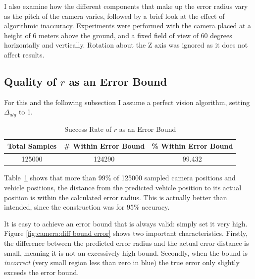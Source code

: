\documentclass[a4paper,12pt,twoside,openright]{report}
\begin{document}
I also examine how the different components that make up the error radius vary
as the pitch of the camera varies, followed by a brief look at the
effect of algorithmic inaccuracy. Experiments were performed
with the camera placed at a height of 6 meters above the ground, and a fixed
field of view of 60 degrees horizontally and vertically. Rotation about the Z axis
was ignored as it does not affect results.

\subsection{Quality of $r$ as an Error Bound}

For this and the following subsection I assume a perfect vision algorithm,
setting $\Delta_{alg}$ to 1.

\begin{table}[htb]
    \centering
    \caption[$r$ as an Error Bound]{Success Rate of $r$ as an Error Bound}
    \label{tab:camera:bound accuracy}
    \begin{tabular}{@{}ccc@{}}
        \toprule
        Total Samples & \# Within Error Bound & \% Within Error Bound \\ \midrule
        125000              & 124290                  & 99.432 
    \end{tabular}
\end{table}

Table~\ref{tab:camera:bound accuracy} shows that more than 99\% of 125000 sampled camera positions
and vehicle positions, the distance from the predicted vehicle position to 
its actual position is within the calculated error radius. This
is actually better than intended, since the construction was for 95\% accuracy.

It is easy to achieve an error bound that is always valid: simply set it very high.
Figure \ref{fig:camera:diff bound error} shows two important characteristics. Firstly, the difference between
the predicted error radius and the actual error distance is small, meaning
it is not an excessively high bound. Secondly, when the bound is \textit{incorrect} (very small region less than zero in blue)
the true error only slightly exceeds the error bound.
\end{document}
